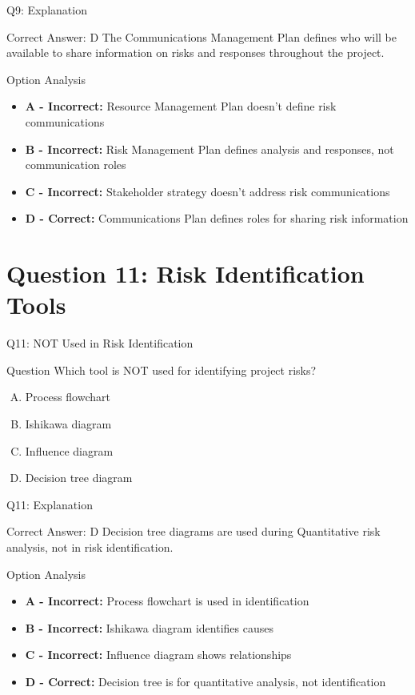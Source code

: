 \documentclass{beamer}
\begin{document}
	\begin{frame}{Q9: Explanation}
		\begin{block}{Correct Answer: D}
			The Communications Management Plan defines who will be available to share information on risks and responses throughout the project.
		\end{block}
		\begin{block}{Option Analysis}
			\begin{itemize}
				\item \textbf{A - Incorrect:} Resource Management Plan doesn't define risk communications
				\item \textbf{B - Incorrect:} Risk Management Plan defines analysis and responses, not communication roles
				\item \textbf{C - Incorrect:} Stakeholder strategy doesn't address risk communications
				\item \textbf{D - Correct:} Communications Plan defines roles for sharing risk information
			\end{itemize}
		\end{block}
	\end{frame}
	

	
	\section{Question 11: Risk Identification Tools}
	
	\begin{frame}{Q11: NOT Used in Risk Identification}
		\begin{block}{Question}
			Which tool is NOT used for identifying project risks?
		\end{block}
		\begin{enumerate}[(A)]
			\item Process flowchart
			\item Ishikawa diagram
			\item Influence diagram
			\item Decision tree diagram
		\end{enumerate}
	\end{frame}
	
	\begin{frame}{Q11: Explanation}
		\begin{block}{Correct Answer: D}
			Decision tree diagrams are used during Quantitative risk analysis, not in risk identification.
		\end{block}
		\begin{block}{Option Analysis}
			\begin{itemize}
				\item \textbf{A - Incorrect:} Process flowchart is used in identification
				\item \textbf{B - Incorrect:} Ishikawa diagram identifies causes
				\item \textbf{C - Incorrect:} Influence diagram shows relationships
				\item \textbf{D - Correct:} Decision tree is for quantitative analysis, not identification
			\end{itemize}
		\end{block}
	\end{frame}
	
\end{document}
